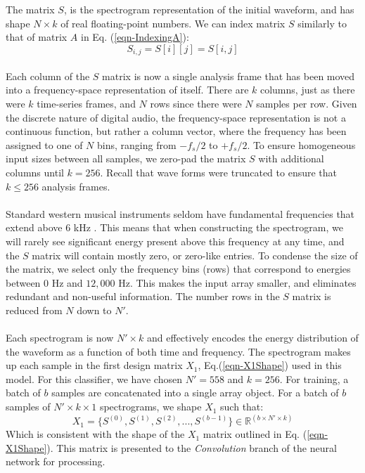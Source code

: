 \documentclass[12pt,letterpaper]{article}
\begin{document}
The matrix $S$, is the spectrogram representation of the initial waveform, and has shape $N \times k$ of real floating-point numbers. We can index matrix $S$ similarly to that of matrix $A$ in Eq. (\ref{eqn-IndexingA}):
\begin{equation}
\label{eqn-IndexingS}
S_{i,j} = S[i][j] = S[i,j]
\end{equation}

\paragraph*{}Each column of the $S$ matrix is now a single analysis frame that has been moved into a frequency-space representation of itself. There are $k$ columns, just as there were $k$ time-series frames, and $N$ rows since there were $N$ samples per row. Given the discrete nature of digital audio, the frequency-space representation is not a continuous function, but rather a column vector, where the frequency has been assigned to one of $N$ bins, ranging from $-f_s / 2$ to $+f_s/2$. To ensure homogeneous input sizes between all samples, we zero-pad the matrix $S$ with additional columns until $k = 256$. Recall that wave forms were truncated to ensure that $k \leq 256$ analysis frames.

\paragraph*{}Standard western musical instruments seldom have fundamental frequencies that extend above $6$ kHz \cite{Olson,Virtanen,White}. This means that when constructing the spectrogram, we will rarely see significant energy present above this frequency at any time, and the $S$ matrix will contain mostly zero, or zero-like entries. To condense the size of the matrix, we select only the frequency bins (rows) that correspond to energies between $0$ Hz and $12,000$ Hz. This makes the input array smaller, and eliminates redundant and non-useful information. The number rows in the $S$ matrix is reduced from $N$ down to $N'$. 

\paragraph*{}Each spectrogram is now $N' \times k$ and effectively encodes the energy distribution of the waveform as a function of both time and frequency. The spectrogram makes up each sample in the first design matrix $X_1$, Eq.(\ref{eqn-X1Shape}) used in this model. For this classifier, we have chosen $N' = 558$ and $k = 256$. For training, a batch of $b$ samples are concatenated into a single array object. For a batch of $b$ samples of $N' \times k \times 1$ spectrograms, we shape $X_1$ such that:
\begin{equation}
\label{eqn-X1}
X_1 = \big\{ S^{(0)},S^{(1)},S^{(2)}, ... , S^{(b-1)} \big\} \in \mathbb{R}^{(b \times N' \times k)}
\end{equation}
Which is consistent with the shape of the $X_1$ matrix outlined in Eq. (\ref{eqn-X1Shape}). This matrix is presented to the \textit{Convolution} branch of the neural network for processing.
\end{document}
